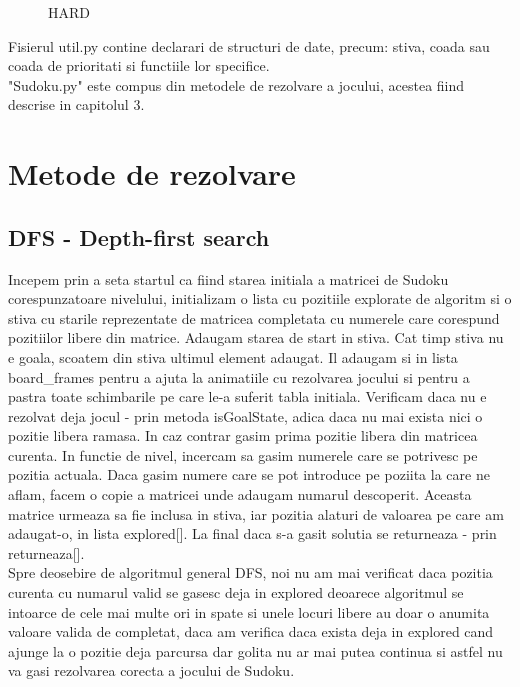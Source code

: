 \documentclass[a4paper,18pt]{article}
\begin{document}
\begin{figure}[!htb]
  \caption{HARD}\label{fig: HARD}
\endminipage
\end{figure}

Fisierul util.py contine declarari de structuri de date, precum: stiva, coada sau coada de prioritati si functiile lor specifice.
\newline 
\\ \indent "Sudoku.py" este compus din metodele de rezolvare a jocului, acestea fiind descrise in capitolul 3.

\newpage
\section{ Metode de rezolvare}
\subsection{ DFS - Depth-first search}

\tab Incepem prin a seta startul ca fiind starea initiala a matricei de Sudoku corespunzatoare nivelului, initializam o lista cu pozitiile explorate de algoritm si o stiva cu starile reprezentate de matricea completata cu numerele care corespund pozitiilor libere din matrice. Adaugam starea de start in stiva. Cat timp stiva nu e goala, scoatem din stiva ultimul element adaugat. Il adaugam si in lista board\_frames pentru a ajuta la animatiile cu rezolvarea jocului si pentru a pastra toate schimbarile pe care le-a suferit tabla initiala. Verificam daca nu e rezolvat deja jocul - prin metoda isGoalState, adica daca nu mai exista nici o pozitie libera ramasa. In caz contrar gasim prima pozitie libera din matricea curenta. In functie de nivel, incercam sa gasim numerele care se potrivesc pe pozitia actuala. Daca gasim numere care se pot introduce pe poziita la care ne aflam, facem o copie a matricei unde adaugam numarul descoperit. Aceasta matrice urmeaza sa fie inclusa in stiva, iar pozitia alaturi de valoarea pe care am adaugat-o, in lista explored[]. La final daca s-a gasit solutia se returneaza - prin returneaza[].
\newline 
\\ \indent Spre deosebire de algoritmul general DFS, noi nu am mai verificat daca pozitia curenta cu numarul valid se gasesc deja in explored deoarece algoritmul se intoarce de cele mai multe ori in spate si unele locuri libere au doar o anumita valoare valida de completat, daca am verifica daca exista deja in explored cand ajunge la o pozitie deja parcursa dar golita nu ar mai putea continua si astfel nu va gasi rezolvarea corecta a jocului de Sudoku.
\end{document}
